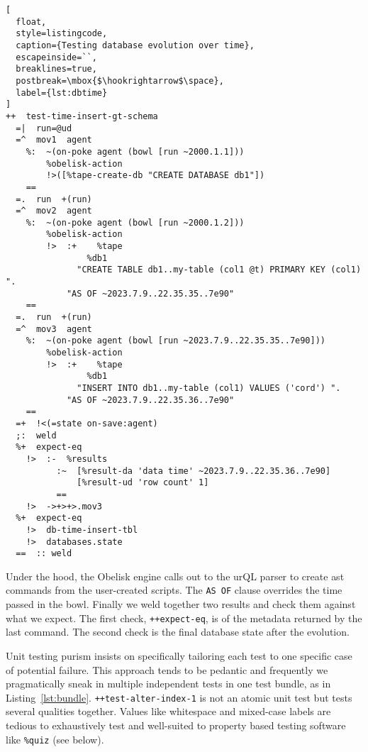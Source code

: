 \documentclass[twoside]{article}
\begin{document}
\begin{lstlisting}[
  float,
  style=listingcode,
  caption={Testing database evolution over time},
  escapeinside=``,
  breaklines=true,
  postbreak=\mbox{$\hookrightarrow$\space},
  label={lst:dbtime}
]
++  test-time-insert-gt-schema
  =|  run=@ud
  =^  mov1  agent  
    %:  ~(on-poke agent (bowl [run ~2000.1.1]))
        %obelisk-action
        !>([%tape-create-db "CREATE DATABASE db1"])
    ==
  =.  run  +(run)
  =^  mov2  agent  
    %:  ~(on-poke agent (bowl [run ~2000.1.2]))
        %obelisk-action
        !>  :+    %tape
                %db1
              "CREATE TABLE db1..my-table (col1 @t) PRIMARY KEY (col1) ".
            "AS OF ~2023.7.9..22.35.35..7e90"
    ==
  =.  run  +(run)
  =^  mov3  agent  
    %:  ~(on-poke agent (bowl [run ~2023.7.9..22.35.35..7e90]))
        %obelisk-action
        !>  :+    %tape 
                %db1 
              "INSERT INTO db1..my-table (col1) VALUES ('cord') ".
            "AS OF ~2023.7.9..22.35.36..7e90"
    ==
  =+  !<(=state on-save:agent)
  ;:  weld
  %+  expect-eq
    !>  :-  %results
          :~  [%result-da 'data time' ~2023.7.9..22.35.36..7e90]
              [%result-ud 'row count' 1]
          ==
    !>  ->+>+>.mov3
  %+  expect-eq
    !>  db-time-insert-tbl
    !>  databases.state
  ==  :: weld
\end{lstlisting}

Under the hood, the Obelisk engine calls out to the urQL parser to create {\sc ast} commands from the user-created scripts. The \texttt{AS OF} clause overrides the time passed in the bowl. Finally we weld together two results and check them against what we expect. The first check, \lstinline[style=inlinecode]{++expect-eq}, is of the metadata returned by the last command. The second check is the final database state after the evolution.

Unit testing purism insists on specifically tailoring each test to one specific case of potential failure. This approach tends to be pedantic and frequently we pragmatically sneak in multiple independent tests in one test bundle, as in Listing~\ref{lst:bundle}.  \lstinline[style=inlinecode]{++test-alter-index-1} is not an atomic unit test but tests several qualities together. Values like whitespace and mixed-case labels are tedious to exhaustively test and well-suited to property based testing software like \lstinline[style=inlinecode]{%quiz} (see below).
\end{document}
